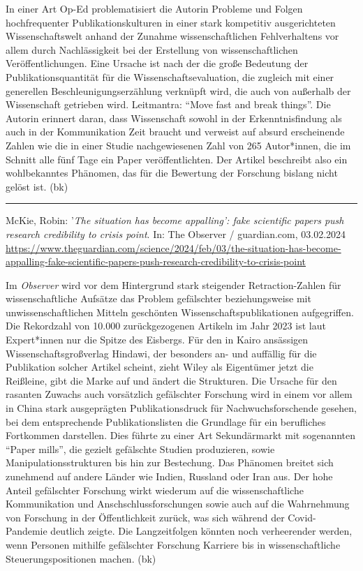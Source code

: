 \documentclass[a4paper,
fontsize=11pt,
oneside,
numbers=noperiodatend,
parskip=half-,
bibliography=totoc,
final
]{scrartcl}
\begin{document}
In einer Art Op-Ed problematisiert die Autorin Probleme und Folgen
hochfrequenter Publikationskulturen in einer stark kompetitiv
ausgerichteten Wissenschaftswelt anhand der Zunahme wissenschaftlichen
Fehlverhaltens vor allem durch Nachlässigkeit bei der Erstellung von
wissenschaftlichen Veröffentlichungen. Eine Ursache ist nach der die
große Bedeutung der Publikationsquantität für die
Wissenschaftsevaluation, die zugleich mit einer generellen
Beschleunigungserzählung verknüpft wird, die auch von außerhalb der
Wissenschaft getrieben wird. Leitmantra: \enquote{Move fast and break
things}. Die Autorin erinnert daran, dass Wissenschaft sowohl in der
Erkenntnisfindung als auch in der Kommunikation Zeit braucht und
verweist auf absurd erscheinende Zahlen wie die in einer Studie
nachgewiesenen Zahl von 265 Autor*innen, die im Schnitt alle fünf Tage
ein Paper veröffentlichten. Der Artikel beschreibt also ein
wohlbekanntes Phänomen, das für die Bewertung der Forschung bislang
nicht gelöst ist. (bk)

\begin{center}\rule{0.5\linewidth}{0.5pt}\end{center}

McKie, Robin: '\emph{The situation has become appalling': fake
scientific papers push research credibility to crisis point}. In: The
Observer / guardian.com, 03.02.2024
\url{https://www.theguardian.com/science/2024/feb/03/the-situation-has-become-appalling-fake-scientific-papers-push-research-credibility-to-crisis-point}

Im \emph{Observer} wird vor dem Hintergrund stark steigender
Retraction-Zahlen für wissenschaftliche Aufsätze das Problem gefälschter
beziehungsweise mit unwissenschaftlichen Mitteln geschönten
Wissenschaftspublikationen aufgegriffen. Die Rekordzahl von 10.000
zurückgezogenen Artikeln im Jahr 2023 ist laut Expert*innen nur die
Spitze des Eisbergs. Für den in Kairo ansässigen Wissenschaftsgroßverlag
Hindawi, der besonders an- und auffällig für die Publikation solcher
Artikel scheint, zieht Wiley als Eigentümer jetzt die Reißleine, gibt
die Marke auf und ändert die Strukturen. Die Ursache für den rasanten
Zuwachs auch vorsätzlich gefälschter Forschung wird in einem vor allem
in China stark ausgeprägten Publikationsdruck für Nachwuchsforschende
gesehen, bei dem entsprechende Publikationslisten die Grundlage für ein
berufliches Fortkommen darstellen. Dies führte zu einer Art
Sekundärmarkt mit sogenannten \enquote{Paper mills}, die gezielt
gefälschte Studien produzieren, sowie Manipulationsstrukturen bis hin
zur Bestechung. Das Phänomen breitet sich zunehmend auf andere Länder
wie Indien, Russland oder Iran aus. Der hohe Anteil gefälschter
Forschung wirkt wiederum auf die wissenschaftliche Kommunikation und
Anschschlussforschungen sowie auch auf die Wahrnehmung von Forschung in
der Öffentlichkeit zurück, was sich während der Covid-Pandemie deutlich
zeigte. Die Langzeitfolgen könnten noch verheerender werden, wenn
Personen mithilfe gefälschter Forschung Karriere bis in
wissenschaftliche Steuerungspositionen machen. (bk)
\end{document}

